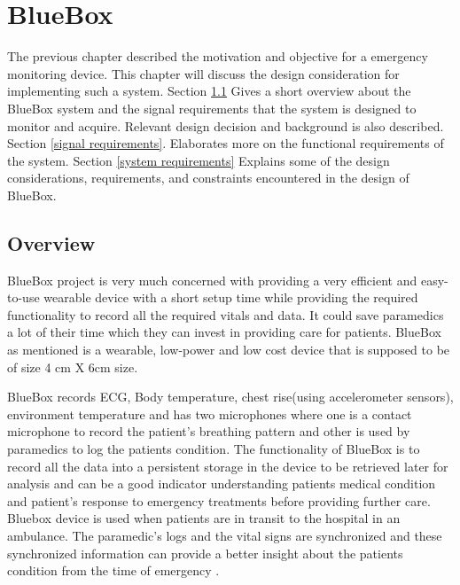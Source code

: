 \chapter{BlueBox }

\hspace{10mm}The previous chapter described the motivation and objective for a emergency monitoring device. This chapter will discuss the design consideration for implementing such a system. 
Section \ref{overview} Gives a short overview about the BlueBox system and the signal requirements that the system is designed to monitor and acquire. Relevant design decision and background is also described. 
Section \ref{signal requirements}. Elaborates more on the functional requirements of the system. 
Section \ref{system requirements} Explains some of the design considerations, requirements, and constraints encountered in the design of BlueBox.

\section{Overview}\label{overview}

\hspace{10mm}BlueBox project is very much concerned with providing a very efficient and easy-to-use wearable  device with a short setup time while providing the required functionality to record all the required vitals and data. It could save paramedics a lot of their time which they can invest in providing care for patients.  BlueBox as mentioned is a wearable, low-power and low cost device that is supposed to be of size 4 cm X 6cm size.

\hspace{10mm}BlueBox records ECG, Body temperature, chest rise(using accelerometer sensors), environment temperature and has two microphones where one is a contact microphone to record the patient's breathing pattern and other is used by paramedics to log the patients condition. The functionality of BlueBox is to record all the data into a persistent storage in the device to be retrieved later for analysis and can be a good indicator understanding patients medical condition and patient's response to emergency treatments before providing further care. Bluebox device is used  when patients are in transit to the hospital in an ambulance. The paramedic's logs and the vital signs are synchronized and these synchronized information can provide a better insight about the patients condition from the time of emergency . 
